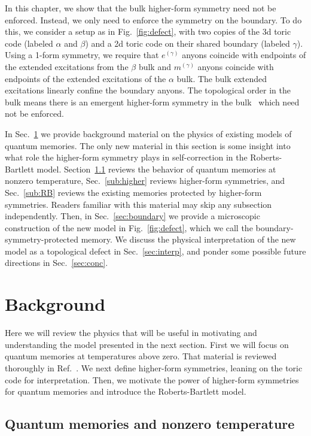 In this chapter, we show that the bulk higher-form symmetry need not be enforced. Instead, we only need to enforce the symmetry on the boundary. To do this, we consider a setup as in Fig.~\ref{fig:defect}, with two copies of the 3d toric code (labeled $\alpha$ and $\beta$) and a 2d toric code on their shared boundary (labeled $\gamma$). Using a 1-form symmetry, we require that $e^{(\gamma)}$ anyons coincide with endpoints of the extended excitations from the $\beta$ bulk and $m^{(\gamma)}$ anyons coincide with endpoints of the extended excitations of the $\alpha$ bulk. The bulk extended excitations linearly confine the boundary anyons. The topological order in the bulk means there is an emergent  higher-form symmetry in the bulk~\cite{Wen2019Higher} which need not be enforced.

In Sec.~\ref{sec:back} we provide background material on the physics of existing models of quantum memories. The only new material in this section is some insight into what role the higher-form symmetry plays in self-correction in the Roberts-Bartlett model. Section~\ref{sub:mems} reviews the behavior of quantum memories at nonzero temperature, Sec.~\ref{sub:higher} reviews higher-form symmetries, and Sec.~\ref{sub:RB} reviews the existing memories protected by higher-form symmetries. Readers familiar with this material may skip any subsection independently.
Then, in Sec.~\ref{sec:boundary} we provide a microscopic construction of the new model in Fig.~\ref{fig:defect}, which we call the boundary-symmetry-protected memory. We discuss the physical interpretation of the new model as a topological defect in Sec.~\ref{sec:interp}, and ponder some possible future directions in Sec.~\ref{sec:conc}.

\section{Background} \label{sec:back}

Here we will review the physics that will be useful in motivating and understanding the model presented in the next section. First we will focus on quantum memories at temperatures above zero. That material is reviewed thoroughly in Ref.~\cite{Brown2016Finite}. We next define higher-form symmetries, leaning on the toric code for interpretation. Then, we motivate the power of higher-form symmetries for quantum memories and introduce the Roberts-Bartlett model.

\subsection{Quantum memories and nonzero temperature} \label{sub:mems}

